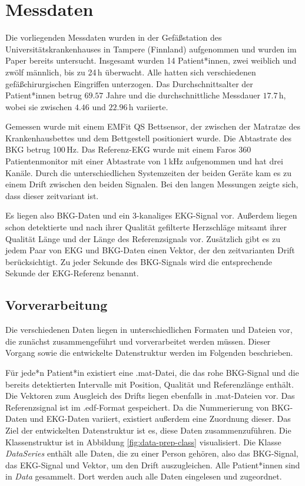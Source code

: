 \section{Messdaten}

	Die vorliegenden Messdaten wurden in der Gefäßstation des Universitätskrankenhauses in Tampere (Finnland) aufgenommen und wurden im Paper  bereits untersucht. Insgesamt wurden 14 Patient*innen, zwei weiblich und zwölf männlich, bis zu 24\,h überwacht. Alle hatten sich verschiedenen gefäßchirurgischen Eingriffen unterzogen. Das Durchschnittsalter der Patient*innen betrug $69.57$ Jahre und die durchschnittliche Messdauer $17.7$\,h, wobei sie zwischen $4.46$ und $22.96$\,h variierte.
	
	Gemessen wurde mit einem EMFit QS Bettsensor, der zwischen der Matratze des Krankenhausbettes und dem Bettgestell positioniert wurde. Die Abtastrate des \ac{BKG} betrug 100\,Hz. Das Referenz-\ac{EKG} wurde mit einem Faros 360 Patientenmonitor mit einer Abtastrate von 1\,kHz aufgenommen und hat drei Kanäle. Durch die unterschiedlichen Systemzeiten der beiden Geräte kam es zu einem Drift zwischen den beiden Signalen. Bei den langen Messungen zeigte sich, dass dieser zeitvariant ist.
	
	Es liegen also \ac{BKG}-Daten und ein 3-kanaliges \ac{EKG}-Signal vor. Außerdem liegen schon detektierte und nach ihrer Qualität gefilterte Herzschläge mitsamt ihrer Qualität Länge und der Länge des Referenzsignals vor. Zusätzlich gibt es zu jedem Paar von \ac{EKG} und \ac{BKG}-Daten einen Vektor, der den zeitvarianten Drift berücksichtigt. Zu jeder Sekunde des \ac{BKG}-Signals wird die entsprechende Sekunde der \ac{EKG}-Referenz benannt.
	
	\subsection{Vorverarbeitung}
	
	Die verschiedenen Daten liegen in unterschiedlichen Formaten und Dateien vor, die zunächst zusammengeführt und vorverarbeitet werden müssen. Dieser Vorgang sowie die entwickelte Datenstruktur werden im Folgenden beschrieben.
	
	Für jede*n Patient*in existiert eine .mat-Datei, die das rohe \ac{BKG}-Signal und die bereits detektierten Intervalle mit Position, Qualität und Referenzlänge enthält. Die Vektoren zum Ausgleich des Drifts liegen ebenfalls in .mat-Dateien vor. Das Referenzsignal ist im .edf-Format gespeichert. Da die Nummerierung von \ac{BKG}-Daten und \ac{EKG}-Daten variiert, existiert außerdem eine Zuordnung dieser. Das Ziel der entwickelten Datenstruktur ist es, diese Daten zusammenzuführen. Die Klassenstruktur ist in Abbildung \ref{fig:data-prep-class} visualisiert. Die Klasse \textit{DataSeries} enthält alle Daten, die zu einer Person gehören, also das \ac{BKG}-Signal, das \ac{EKG}-Signal und Vektor, um den Drift auszugleichen. Alle Patient*innen sind in \textit{Data} gesammelt. Dort werden auch alle Daten eingelesen und zugeordnet.
	

